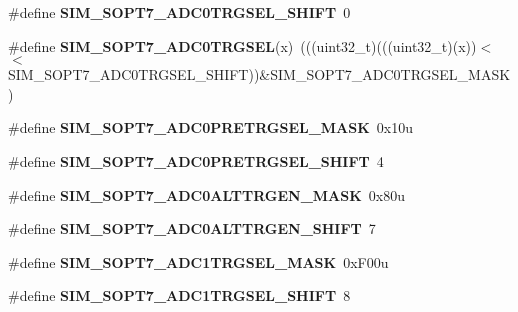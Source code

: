 \begin{DoxyCompactItemize}
\item 
\#define {\bfseries S\+I\+M\+\_\+\+S\+O\+P\+T7\+\_\+\+A\+D\+C0\+T\+R\+G\+S\+E\+L\+\_\+\+S\+H\+I\+FT}~0\hypertarget{group__SIM__Register__Masks_ga914ced2a5cf4e7f37371d52d34d4a930}{}\label{group__SIM__Register__Masks_ga914ced2a5cf4e7f37371d52d34d4a930}

\item 
\#define {\bfseries S\+I\+M\+\_\+\+S\+O\+P\+T7\+\_\+\+A\+D\+C0\+T\+R\+G\+S\+EL}(x)~(((uint32\+\_\+t)(((uint32\+\_\+t)(x))$<$$<$S\+I\+M\+\_\+\+S\+O\+P\+T7\+\_\+\+A\+D\+C0\+T\+R\+G\+S\+E\+L\+\_\+\+S\+H\+I\+FT))\&S\+I\+M\+\_\+\+S\+O\+P\+T7\+\_\+\+A\+D\+C0\+T\+R\+G\+S\+E\+L\+\_\+\+M\+A\+SK)\hypertarget{group__SIM__Register__Masks_gab4fec73a0cfeecaa863fc29f85326f4a}{}\label{group__SIM__Register__Masks_gab4fec73a0cfeecaa863fc29f85326f4a}

\item 
\#define {\bfseries S\+I\+M\+\_\+\+S\+O\+P\+T7\+\_\+\+A\+D\+C0\+P\+R\+E\+T\+R\+G\+S\+E\+L\+\_\+\+M\+A\+SK}~0x10u\hypertarget{group__SIM__Register__Masks_ga74544c6c9d4fbc593884681ac79c796f}{}\label{group__SIM__Register__Masks_ga74544c6c9d4fbc593884681ac79c796f}

\item 
\#define {\bfseries S\+I\+M\+\_\+\+S\+O\+P\+T7\+\_\+\+A\+D\+C0\+P\+R\+E\+T\+R\+G\+S\+E\+L\+\_\+\+S\+H\+I\+FT}~4\hypertarget{group__SIM__Register__Masks_gaee870f942318f14376ee9e6d5558e2ff}{}\label{group__SIM__Register__Masks_gaee870f942318f14376ee9e6d5558e2ff}

\item 
\#define {\bfseries S\+I\+M\+\_\+\+S\+O\+P\+T7\+\_\+\+A\+D\+C0\+A\+L\+T\+T\+R\+G\+E\+N\+\_\+\+M\+A\+SK}~0x80u\hypertarget{group__SIM__Register__Masks_ga6390cd75db35ecc6c5fc6d5b0d417a7d}{}\label{group__SIM__Register__Masks_ga6390cd75db35ecc6c5fc6d5b0d417a7d}

\item 
\#define {\bfseries S\+I\+M\+\_\+\+S\+O\+P\+T7\+\_\+\+A\+D\+C0\+A\+L\+T\+T\+R\+G\+E\+N\+\_\+\+S\+H\+I\+FT}~7\hypertarget{group__SIM__Register__Masks_gaa20ed5f5ab9cf02714a993c3996adcc5}{}\label{group__SIM__Register__Masks_gaa20ed5f5ab9cf02714a993c3996adcc5}

\item 
\#define {\bfseries S\+I\+M\+\_\+\+S\+O\+P\+T7\+\_\+\+A\+D\+C1\+T\+R\+G\+S\+E\+L\+\_\+\+M\+A\+SK}~0x\+F00u\hypertarget{group__SIM__Register__Masks_ga1c262a802f5341d2b3f9e3750fec1244}{}\label{group__SIM__Register__Masks_ga1c262a802f5341d2b3f9e3750fec1244}

\item 
\#define {\bfseries S\+I\+M\+\_\+\+S\+O\+P\+T7\+\_\+\+A\+D\+C1\+T\+R\+G\+S\+E\+L\+\_\+\+S\+H\+I\+FT}~8\hypertarget{group__SIM__Register__Masks_ga41e9a42e300b2132d8877fb9a01a6fa1}{}\label{group__SIM__Register__Masks_ga41e9a42e300b2132d8877fb9a01a6fa1}


\end{DoxyCompactItemize}
